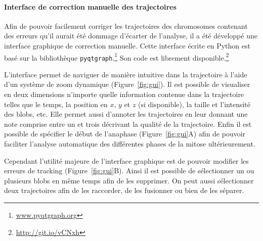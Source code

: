 \documentclass[12pt,a4paper,twoside,openright]{book}
\let\oldparagraph\paragraph
\renewcommand{\paragraph}[1]{\oldparagraph{#1}\mbox{}}
\begin{document}
\paragraph{Interface de correction manuelle des
trajectoires}\label{interface-de-correction-manuelle-des-trajectoires}

Afin de pouvoir facilement corriger les trajectoires des chromosomes
contenant des erreurs qu'il aurait été dommage d'écarter de l'analyse,
il a été développé une interface graphique de correction manuelle. Cette
interface écrite en Python est basé sur la bibliothèque
\texttt{pyqtgraph}.\footnote{\url{www.pyqtgraph.org}} Son code est
librement disponible.\footnote{\url{http://git.io/vCNxh}}

L'interface permet de naviguer de manière intuitive dans la trajectoire
à l'aide d'un système de zoom dynamique (Figure~\ref{fig:gui}). Il est
possible de visualiser en deux dimensions n'importe quelle information
contenue dans la trajectoire telles que le temps, la position en \(x\),
\(y\) et \(z\) (si disponible), la taille et l'intensité des blobs, etc.
Elle permet aussi d'annoter les trajectoires en leur donnant une note
comprise entre un et trois décrivant la qualité de la trajectoire. Enfin
il est possible de spécifier le début de l'anaphase
(Figure~\ref{fig:gui}A) afin de pouvoir faciliter l'analyse automatique
des différentes phases de la mitose ultérieurement.

Cependant l'utilité majeure de l'interface graphique est de pouvoir
modifier les erreurs de tracking (Figure~\ref{fig:gui}B). Ainsi il est
possible de sélectionner un ou plusieurs blobs en même temps afin de les
supprimer. On peut aussi sélectionner deux trajectoires afin de les
raccorder, de les fusionner ou bien de les séparer.
\end{document}
